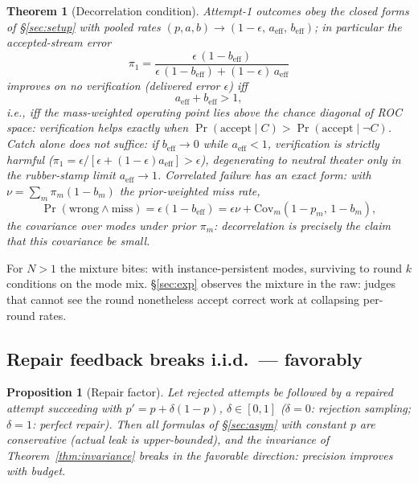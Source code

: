 \documentclass[10pt]{article}
\newtheorem{theorem}{Theorem}
\newtheorem{proposition}{Proposition}
\begin{document}
\begin{theorem}[Decorrelation condition]\label{thm:decorr}
Attempt-1 outcomes obey the closed forms of §\ref{sec:setup} with
pooled rates $(p,a,b) \to (1-\epsilon,\, a_{\mathrm{eff}},\,
b_{\mathrm{eff}})$; in particular the accepted-stream error
\[
\pi_1 = \frac{\epsilon\,(1-b_{\mathrm{eff}})}
{\epsilon\,(1-b_{\mathrm{eff}}) + (1-\epsilon)\,a_{\mathrm{eff}}}
\]
improves on no verification (delivered error $\epsilon$) iff
\[
a_{\mathrm{eff}} + b_{\mathrm{eff}} > 1,
\]
i.e., iff the mass-weighted operating point lies above the chance
diagonal of ROC space: verification helps exactly when
$\Pr(\text{accept}\mid C) > \Pr(\text{accept}\mid \neg C)$.  Catch
alone does not suffice: if $b_{\mathrm{eff}} \to 0$ while
$a_{\mathrm{eff}} < 1$, verification is \emph{strictly harmful}
($\pi_1 = \epsilon/[\epsilon+(1-\epsilon)a_{\mathrm{eff}}] >
\epsilon$), degenerating to neutral theater only in the
rubber-stamp limit $a_{\mathrm{eff}} \to 1$.  Correlated failure has
an exact form: with $\nu = \sum_m \pi_m(1-b_m)$ the prior-weighted
miss rate,
\[
\Pr(\text{wrong} \wedge \text{miss})
= \epsilon(1-b_{\mathrm{eff}})
= \epsilon\nu + \mathrm{Cov}_m(1-p_m,\,1-b_m),
\]
the covariance over modes under prior $\pi_m$: decorrelation is
precisely the claim that this covariance be small.
\end{theorem}

For $N>1$ the mixture bites: with instance-persistent modes,
surviving to round $k$ conditions on the mode mix.  §\ref{sec:exp}
observes the mixture in the raw: judges that cannot see the round
nonetheless accept correct work at collapsing per-round rates.

\subsection{Repair feedback breaks i.i.d.\ --- favorably}\label{sec:repair}

\begin{proposition}[Repair factor]\label{prop:delta}
Let rejected attempts be followed by a repaired attempt succeeding
with $p' = p + \delta(1-p)$, $\delta \in [0,1]$ ($\delta=0$:
rejection sampling; $\delta=1$: perfect repair).  Then all
formulas of §\ref{sec:asym} with constant $p$ are conservative
(actual leak is upper-bounded), and the invariance of
Theorem~\ref{thm:invariance} breaks in the favorable direction:
precision improves with budget.
\end{proposition}
\end{document}
